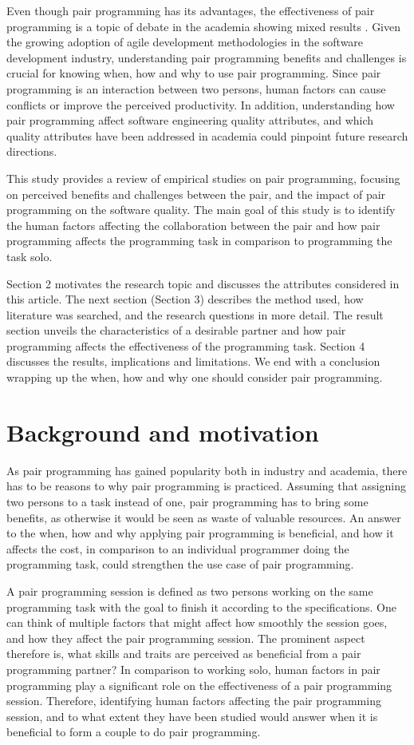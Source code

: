 \documentclass[conference]{IEEEtran}
\begin{document}
Even though pair programming has its advantages, the effectiveness of pair programming is a topic of debate in the academia showing mixed results \cite{Hannay2009effectiveness}. Given the growing adoption of agile development methodologies in the software development industry, understanding pair programming benefits and challenges is crucial for knowing when, how and why to use pair programming. Since pair programming is an interaction between two persons, human factors can cause conflicts or improve the perceived productivity. In addition, understanding how pair programming affect software engineering quality attributes, and which quality attributes have been addressed in academia could pinpoint future research directions.

This study provides a review of empirical studies on pair programming, focusing on perceived benefits and challenges between the pair, and the impact of pair programming on the software quality. The main goal of this study is to identify the human factors affecting the collaboration between the pair and how pair programming affects the programming task in comparison to programming the task solo.

Section 2 motivates the research topic and discusses the attributes considered in this article. The next section (Section 3) describes the method used, how literature was searched, and the research questions in more detail. The result section unveils the characteristics of a desirable partner and how pair programming affects the effectiveness of the programming task. Section 4 discusses the results, implications and limitations. We end with a conclusion wrapping up the when, how and why one should consider pair programming.

\section{Background and motivation}

As pair programming has gained popularity both in industry and academia, there has to be reasons to why pair programming is practiced. Assuming that assigning two persons to a task instead of one, pair programming has to bring some benefits, as otherwise it would be seen as waste of valuable resources. An answer to the when, how and why applying pair programming is beneficial, and how it affects the cost, in comparison to an individual programmer doing the programming task, could strengthen the use case of pair programming.

A pair programming session is defined as two persons working on the same programming task with the goal to finish it according to the specifications. One can think of multiple factors that might affect how smoothly the session goes, and how they affect the pair programming session. The prominent aspect therefore is, what skills and traits are perceived as beneficial from a pair programming partner? In comparison to working solo, human factors in pair programming play a significant role on the effectiveness of a pair programming session. Therefore, identifying human factors affecting the pair programming session, and to what extent they have been studied would answer when it is beneficial to form a couple to do pair programming.
\end{document}
